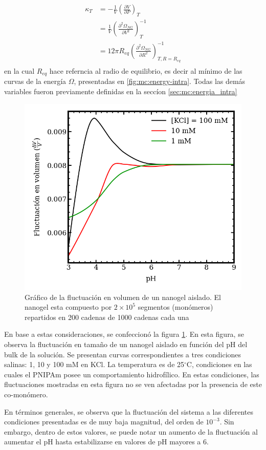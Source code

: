 	
	\begin{align}
		\begin{aligned}
			\kappa_T & = -\frac{1}{V} \left( \frac{\partial V}{\partial P}\right)_T \\
			& =\frac{1}{V} \left( \frac{\partial^2 \Omega_{NG}}{\partial V^2}\right)^{-1}_T \\
			& = 12 \pi R_{eq} \left( \frac{\partial^2 \Omega_{NG}}{\partial R^2}\right)^{-1}_{T,R=R_{eq}}
		\end{aligned}
	\end{align}
	\noindent en la cual $R_{eq}$ hace referncia al radio de equilibrio, es decir al m\'inimo de las curvas de la energ\'ia $ \Omega$, presentadas en \ref{fig:mc:energy-intra}. Todas las dem\'as variables fueron previamente definidas en la secc\'ion \ref{sec:mc:energia_intra}
	
	\begin{figure}
		\centering
		\includegraphics[width=0.45\linewidth]{Figures/graph-mc/fluct-pH.png}
		\caption{Gr\'afico de la fluctuaci\'on en volumen de un nanogel aislado. El nanogel esta compuesto por $2\times 10^5$ segmentos (mon\'omeros) repartidos en 200 cadenas de 1000 cadenas cada una}
		\label{fig:mc:flut-pH}
	\end{figure}
	
	En base a estas consideraciones, se confeccion\'o la figura \ref{fig:mc:flut-pH}. En esta figura, se observa la fluctuaci\'on en tama\~no de un nanogel aislado en funci\'on del pH del bulk de la soluci\'on. Se presentan curvas correspondientes a tres condiciones salinas: 1, 10 y 100 mM en KCl. La temperatura es de 25$^\circ$C, condiciones en las cuales el PNIPAm posee un comportamiento hidrof\'ilico. En estas condiciones, las fluctuaciones mostradas en esta figura no se ven afectadas por la presencia de este co-mon\'omero.
	
	En t\'erminos generales, se observa que la fluctuaci\'on del sistema a las diferentes condiciones presentadas es de muy baja magnitud, del orden de $10^{-3}$. Sin embargo, dentro de estos valores, se puede notar un aumento de la fluctuaci\'on al aumentar el pH hasta estabilizarse en valores de pH mayores a 6.
	
